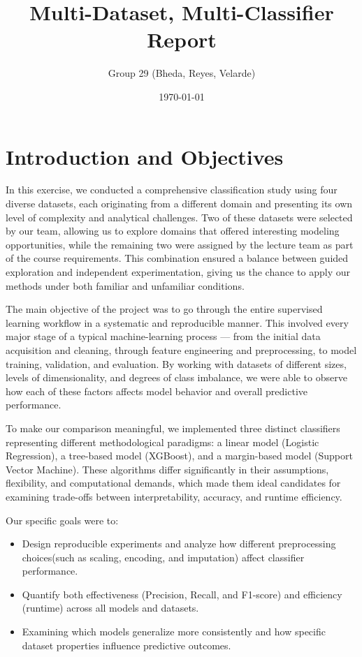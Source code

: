 \documentclass[12pt,a4paper]{article}
\title{Multi-Dataset, Multi-Classifier Report}
\author{Group 29 (Bheda, Reyes, Velarde)}
\date{\today}
\begin{document}
\maketitle

\vspace{1.0cm}

\section{Introduction and Objectives}
\label{sec:intro}
In this exercise, we conducted a comprehensive classification study using four diverse datasets, each originating from a different domain and presenting its own level of complexity and analytical challenges.
Two of these datasets were selected by our team, allowing us to explore domains that offered interesting modeling opportunities, while the remaining two were assigned by the lecture team as part of the course requirements. This combination ensured a balance between guided exploration and independent experimentation, giving us the chance to apply our methods under both familiar and unfamiliar conditions.

The main objective of the project was to go through the entire supervised learning workflow in a systematic and reproducible manner. This involved every major stage of a typical machine-learning process — from the initial data acquisition and cleaning, through feature engineering and preprocessing, to model training, validation, and evaluation. By working with datasets of different sizes, levels of dimensionality, and degrees of class imbalance, we were able to observe how each of these factors affects model behavior and overall predictive performance.

To make our comparison meaningful, we implemented three distinct classifiers representing different methodological paradigms: a linear model (Logistic Regression), a tree-based model (XGBoost), and a margin-based model (Support Vector Machine). These algorithms differ significantly in their assumptions, flexibility, and computational demands, which made them ideal candidates for examining trade-offs between interpretability, accuracy, and runtime efficiency.

Our specific goals were to:
\begin{itemize}
\item Design reproducible experiments and analyze how different preprocessing choices(such as scaling, encoding, and imputation) affect classifier performance.
\item Quantify both effectiveness (Precision, Recall, and F1-score) and efficiency (runtime) across all models and datasets.
\item Examining which models generalize more consistently and how specific dataset properties influence predictive outcomes.
\end{itemize}
\end{document}
